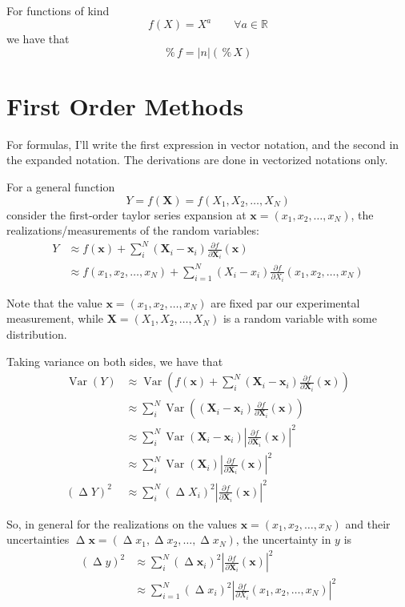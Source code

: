 \documentclass[a4paper,11pt]{article}
\DeclareMathOperator{\var}{\operatorname{Var}}
\DeclareMathOperator{\uncertabs}{\Delta}
\DeclareMathOperator{\uncertrel}{\%}
\begin{document}
For functions of kind
\[
    f(X) = X^a \qquad \forall a \in \mathbb{R}
\]
we have that
\[
    \uncertrel f = |n| (\uncertrel X)
\]

\newpage
\section{First Order Methods}
For formulas, I'll write the first expression in vector notation, and the second in the expanded notation. The derivations are done in vectorized notations only.

For a general function
\[
    Y = f(\bm{X}) = f(X_1, X_2, \dots, X_N)
\]
consider the first-order taylor series expansion at $\bm{x} = (x_1, x_2, \dots, x_N)$, the realizations/measurements of the random variables:
\begin{align*}
    Y &\approx f(\bm{x}) + \sum_i^N (\bm{X}_i - \bm{x}_i) \frac{\partial f}{\partial \bm{X}_i} (\bm{x}) \\
    &\approx f(x_1, x_2, \dots, x_N) + \sum_{i=1}^N (X_i - x_i)\frac{\partial f}{\partial X_i} (x_1, x_2, \dots, x_N)
\end{align*}

Note that the value $\bm{x} = (x_1, x_2, \dots, x_N)$ are fixed par our experimental measurement, while $\bm{X} = (X_1, X_2, \dots, X_N)$ is a random variable with some distribution.

Taking variance on both sides, we have that
\begin{align*}
    \var(Y) &\approx \var \left(f(\bm{x}) + \sum_i^N (\bm{X}_i - \bm{x}_i) \frac{\partial f}{\partial \bm{X}_i} (\bm{x})\right)\\
    &\approx \sum_i^N \var \left((\bm{X}_i - \bm{x}_i) \frac{\partial f}{\partial \bm{X}_i} (\bm{x})
    \right)\\
    &\approx \sum_i^N \var (\bm{X}_i - \bm{x}_i) \left| \frac{\partial f}{\partial \bm{X}_i} (\bm{x})\right|^2\\
    &\approx \sum_i^N \var (\bm{X}_i) \left| \frac{\partial f}{\partial \bm{X}_i} (\bm{x})\right|^2\\
    (\uncertabs Y)^2 &\approx \sum_i^N (\uncertabs X_i)^2 \left| \frac{\partial f}{\partial \bm{X}_i} (\bm{x})\right|^2
\end{align*}

So, in general for the realizations on the values $\bm{x} = (x_1, x_2, \dots, x_N)$ and their uncertainties $\uncertabs \bm{x} = (\uncertabs x_1, \uncertabs x_2, \dots, \uncertabs x_N)$, the uncertainty in $y$ is
\begin{align*}
    (\uncertabs y)^2 &\approx \sum_i^N (\uncertabs \bm{x}_i)^2 \left| \frac{\partial f}{\partial \bm{X}_i} (\bm{x})\right|^2\\
    &\approx \sum_{i=1}^N (\uncertabs x_i)^2 \left| \frac{\partial f}{\partial X_i} (x_1, x_2, \dots, x_N)\right|^2
\end{align*}
\end{document}
